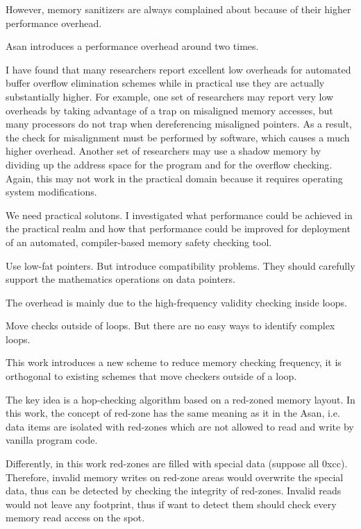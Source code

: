 However, memory sanitizers are always complained about because of their higher performance overhead.

Asan introduces a performance overhead around two times.

I have found that many researchers report excellent low overheads for automated buffer overflow elimination schemes while in practical use they are actually substantially higher. For example, one set of researchers may report very low overheads by taking advantage of a trap on misaligned memory accesses, but many processors do not trap when dereferencing misaligned pointers. As a result, the check for misalignment must be performed by software, which causes a much higher overhead. Another set of researchers may use a shadow memory by dividing up the address space for the program and for the overflow checking. Again, this may not work in the practical domain because it requires operating system modifications.

We need practical solutons.
I investigated what performance could be achieved in the practical realm and how that performance could be improved for deployment of an automated, compiler-based memory safety checking tool.

Use low-fat pointers. But introduce compatibility problems.
They should carefully support the mathematics operations on data pointers.

The overhead is mainly due to the high-frequency validity checking inside loops.

Move checks outside of loops. But there are no easy ways to identify complex loops.


This work introduces a new scheme to reduce memory checking frequency,
it is orthogonal to existing schemes that move checkers outside of a loop.

The key idea is a hop-checking algorithm based on a red-zoned memory layout.
In this work, the concept of red-zone has the same meaning as it in the Asan,
i.e. data items are isolated with red-zones which are not allowed to read and write by vanilla program code.

Differently, in this work red-zones are filled with special data (suppose all 0xcc).
Therefore, invalid memory writes on red-zone areas would overwrite the special data,
thus can be detected by checking the integrity of red-zones.
Invalid reads would not leave any footprint, thus if want to detect them should check every memory read access on the spot.

